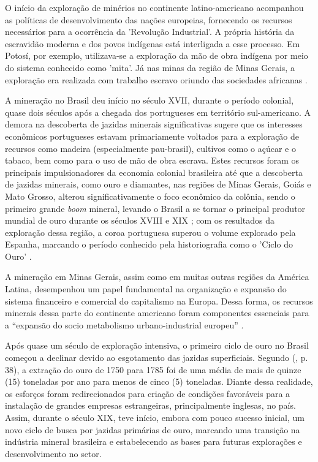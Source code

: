 O início da exploração de minérios no continente latino-americano acompanhou as políticas de desenvolvimento das nações europeias, fornecendo os recursos necessários para a ocorrência da 'Revolução Industrial'. A própria história da escravidão moderna e dos povos indígenas está interligada a esse processo. Em Potosí, por exemplo, utilizava-se a exploração da mão de obra indígena por meio do sistema conhecido como 'mita'. Já nas minas da região de Minas Gerais, a exploração era realizada com trabalho escravo oriundo das sociedades africanas \cite[p. 5]{domingues2022historia}.

A mineração no Brasil deu início no século XVII, durante o período colonial, quase dois séculos após a chegada dos portugueses em território sul-americano. A demora na descoberta de jazidas minerais significativas sugere que os interesses econômicos portugueses estavam primariamente voltados para a exploração de recursos como madeira (especialmente pau-brasil), cultivos como o açúcar e o tabaco, bem como para o uso de mão de obra escrava. Estes recursos foram os principais impulsionadores da economia colonial brasileira até que a descoberta de jazidas minerais, como ouro e diamantes, nas regiões de Minas Gerais, Goiás e Mato Grosso, alterou significativamente o foco econômico da colônia, sendo o primeiro grande \textit{boom} mineral, levando o Brasil a se tornar o principal produtor mundial de ouro durante os séculos XVIII e XIX \cite[p. 5]{barreto2001mineracao}; com os resultados da exploração dessa região, a coroa portuguesa superou o volume explorado pela Espanha, marcando o período conhecido pela historiografia como o 'Ciclo do Ouro' \cite[p. 6]{domingues2022historia}.

A mineração em Minas Gerais, assim como em muitas outras regiões da América Latina, desempenhou um papel fundamental na organização e expansão do sistema financeiro e comercial do capitalismo na Europa. Dessa forma, os recursos minerais dessa parte do continente americano foram componentes essenciais para a ``expansão do socio metabolismo urbano-industrial europeu'' \cite[p. 181]{araoz2020mineracao}.

Após quase um século de exploração intensiva, o primeiro ciclo de ouro no Brasil começou a declinar devido ao esgotamento das jazidas superficiais. Segundo \citeauthor{figueiroa1997ciencias} (\citeyear{figueiroa1997ciencias}, p. 38), a extração do ouro de 1750 para 1785 foi de uma média de mais de quinze (15) toneladas por ano para menos de cinco (5) toneladas. Diante dessa realidade, os esforços foram redirecionados para criação de condições favoráveis para a instalação de grandes empresas estrangeiras, principalmente inglesas, no país. Assim, durante o século XIX, teve início, embora com pouco sucesso inicial, um novo ciclo de busca por jazidas primárias de ouro, marcando uma transição na indústria mineral brasileira e estabelecendo as bases para futuras explorações e desenvolvimento no setor.

